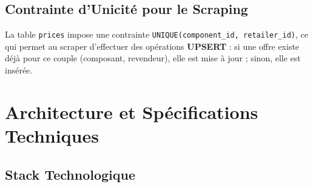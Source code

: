 \documentclass[12pt,a4paper]{article}
\begin{document}
\subsection{Contrainte d'Unicité pour le Scraping}

La table \texttt{prices} impose une contrainte \texttt{UNIQUE(component\_id, retailer\_id)}, ce qui permet au scraper d'effectuer des opérations \textbf{UPSERT} : si une offre existe déjà pour ce couple (composant, revendeur), elle est mise à jour ; sinon, elle est insérée.

\section{Architecture et Spécifications Techniques}

\subsection{Stack Technologique}
\end{document}
